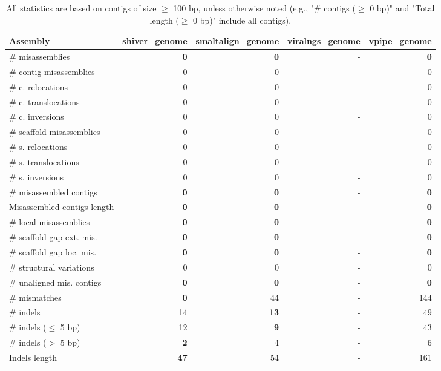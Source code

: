 \documentclass[12pt,a4paper]{article}
\begin{document}
\begin{table}[ht]
\begin{center}
\caption{All statistics are based on contigs of size $\geq$ 100 bp, unless otherwise noted (e.g., "\# contigs ($\geq$ 0 bp)" and "Total length ($\geq$ 0 bp)" include all contigs).}
\begin{tabular}{|l*{4}{|r}|}
\hline
Assembly & shiver\_genome & smaltalign\_genome & viralngs\_genome & vpipe\_genome \\ \hline
\# misassemblies & {\bf 0} & {\bf 0} & - & {\bf 0} \\ \hline
\hspace{2mm}\# contig misassemblies & 0 & 0 & - & 0 \\ \hline
\hspace{5mm}\# c. relocations & 0 & 0 & - & 0 \\ \hline
\hspace{5mm}\# c. translocations & 0 & 0 & - & 0 \\ \hline
\hspace{5mm}\# c. inversions & 0 & 0 & - & 0 \\ \hline
\hspace{2mm}\# scaffold misassemblies & 0 & 0 & - & 0 \\ \hline
\hspace{5mm}\# s. relocations & 0 & 0 & - & 0 \\ \hline
\hspace{5mm}\# s. translocations & 0 & 0 & - & 0 \\ \hline
\hspace{5mm}\# s. inversions & 0 & 0 & - & 0 \\ \hline
\# misassembled contigs & {\bf 0} & {\bf 0} & - & {\bf 0} \\ \hline
Misassembled contigs length & {\bf 0} & {\bf 0} & - & {\bf 0} \\ \hline
\# local misassemblies & {\bf 0} & {\bf 0} & - & {\bf 0} \\ \hline
\# scaffold gap ext. mis. & {\bf 0} & {\bf 0} & - & {\bf 0} \\ \hline
\# scaffold gap loc. mis. & {\bf 0} & {\bf 0} & - & {\bf 0} \\ \hline
\# structural variations & 0 & 0 & - & 0 \\ \hline
\# unaligned mis. contigs & {\bf 0} & {\bf 0} & - & {\bf 0} \\ \hline
\# mismatches & {\bf 0} & 44 & - & 144 \\ \hline
\# indels & 14 & {\bf 13} & - & 49 \\ \hline
\hspace{5mm}\# indels ($\leq$ 5 bp) & 12 & {\bf 9} & - & 43 \\ \hline
\hspace{5mm}\# indels ($>$ 5 bp) & {\bf 2} & 4 & - & 6 \\ \hline
Indels length & {\bf 47} & 54 & - & 161 \\ \hline
\end{tabular}
\end{center}
\end{table}
\end{document}
